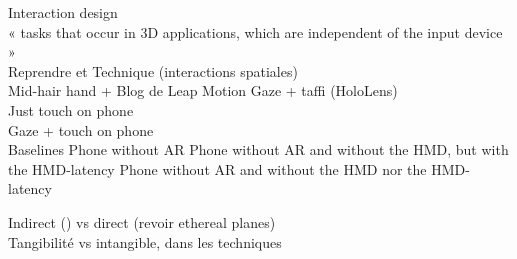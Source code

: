     Interaction design\\
    	« tasks that occur in 3D applications, which are independent of the input device » \cite{JankowskiHachet2013} \\
    	Reprendre \cite{Bernatchez2008} et \cite{JankowskiHachet2013}
    	Technique (interactions spatiales) \\
            Mid-hair hand \cite{EnsFinneganIrani2014} \cite{ChanKaoChenEtAl2010} \cite{JonesSodhiForsythEtAl2012} + Blog de Leap Motion
            Gaze + taffi (HoloLens) \\
            Just touch on phone \\
            Gaze + touch on phone \\
            Baselines
            	Phone without AR
            	Phone without AR and without the HMD, but with the HMD-latency
            	Phone without AR and without the HMD nor the HMD-latency

        Indirect (\cite{TeatherStuerzlinger2011}) vs direct (revoir ethereal planes) \\
        Tangibilité vs intangible, dans les techniques \\



